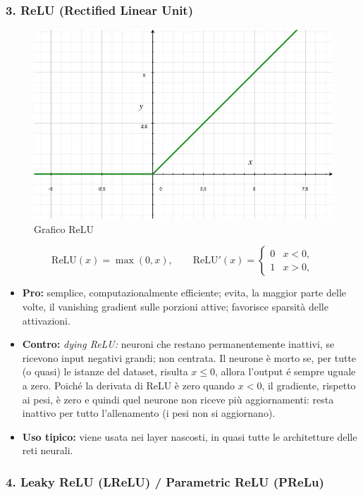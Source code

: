 \documentclass[a4paper,12pt]{report}
\begin{document}
	\subsubsection{3. ReLU (Rectified Linear Unit)}
	
	\begin{figure}[H]
		\centering
		\includegraphics[width=1.0\textwidth]{img/relu.png}
		\caption{Grafico ReLU}
	\end{figure}
	
	\[
	\mathrm{ReLU}(x)=\max(0,x),\qquad
	\mathrm{ReLU}'(x)=\begin{cases}0 & x<0,\\ 1 & x>0,\end{cases}
	\]
	\begin{itemize}
		\item \textbf{Pro:} semplice, computazionalmente efficiente; evita, la maggior parte delle volte, il vanishing gradient sulle porzioni attive; favorisce sparsità delle attivazioni.
		\item \textbf{Contro:} \emph{dying ReLU:} neuroni che restano permanentemente inattivi, se ricevono input negativi grandi; non centrata. Il neurone è morto se, per tutte (o quasi) le istanze del dataset, risulta $x\le0$, allora l’output é sempre uguale a zero. Poiché la derivata di ReLU è zero quando $x<0$, il gradiente, rispetto ai pesi, è zero e quindi quel neurone non riceve più aggiornamenti: resta inattivo per tutto l’allenamento (i pesi non si aggiornano).
		\item \textbf{Uso tipico:} viene usata nei layer nascosti, in quasi tutte le architetture delle reti neurali.
	\end{itemize}
	
	\subsubsection{4. Leaky ReLU (LReLU) / Parametric ReLU (PReLu)}
	
\end{document}
